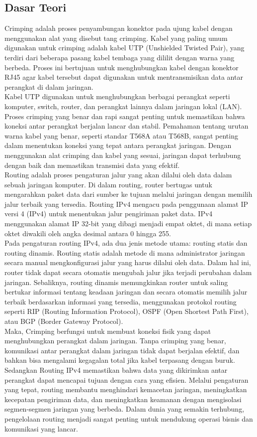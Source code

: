 \subsection{Dasar Teori}
Crimping adalah proses penyambungan konektor pada ujung kabel dengan menggunakan alat yang disebut tang crimping. Kabel yang paling umum digunakan untuk crimping adalah kabel UTP (Unshielded Twisted Pair), yang terdiri dari beberapa pasang kabel tembaga yang dililit dengan warna yang berbeda. Proses ini bertujuan untuk menghubungkan kabel dengan konektor RJ45 agar kabel tersebut dapat digunakan untuk mentransmisikan data antar perangkat di dalam jaringan.\\
Kabel UTP digunakan untuk menghubungkan berbagai perangkat seperti komputer, switch, router, dan perangkat lainnya dalam jaringan lokal (LAN). Proses crimping yang benar dan rapi sangat penting untuk memastikan bahwa koneksi antar perangkat berjalan lancar dan stabil. Pemahaman tentang urutan warna kabel yang benar, seperti standar T568A atau T568B, sangat penting dalam menentukan koneksi yang tepat antara perangkat jaringan. Dengan menggunakan alat crimping dan kabel yang sesuai, jaringan dapat terhubung dengan baik dan memastikan transmisi data yang efektif.\\
Routing adalah proses pengaturan jalur yang akan dilalui oleh data dalam sebuah jaringan komputer. Di dalam routing, router bertugas untuk mengarahkan paket data dari sumber ke tujuan melalui jaringan dengan memilih jalur terbaik yang tersedia. Routing IPv4 mengacu pada penggunaan alamat IP versi 4 (IPv4) untuk menentukan jalur pengiriman paket data. IPv4 menggunakan alamat IP 32-bit yang dibagi menjadi empat oktet, di mana setiap oktet diwakili oleh angka desimal antara 0 hingga 255.\\
Pada pengaturan routing IPv4, ada dua jenis metode utama: routing statis dan routing dinamis. Routing statis adalah metode di mana administrator jaringan secara manual mengkonfigurasi jalur yang harus dilalui oleh data. Dalam hal ini, router tidak dapat secara otomatis mengubah jalur jika terjadi perubahan dalam jaringan. Sebaliknya, routing dinamis memungkinkan router untuk saling bertukar informasi tentang keadaan jaringan dan secara otomatis memilih jalur terbaik berdasarkan informasi yang tersedia, menggunakan protokol routing seperti RIP (Routing Information Protocol), OSPF (Open Shortest Path First), atau BGP (Border Gateway Protocol).\\
Maka, Crimping berfungsi untuk membuat koneksi fisik yang dapat menghubungkan perangkat dalam jaringan. Tanpa crimping yang benar, komunikasi antar perangkat dalam jaringan tidak dapat berjalan efektif, dan bahkan bisa mengalami kegagalan total jika kabel terpasang dengan buruk. Sedangkan Routing IPv4 memastikan bahwa data yang dikirimkan antar perangkat dapat mencapai tujuan dengan cara yang efisien. Melalui pengaturan yang tepat, routing membantu menghindari kemacetan jaringan, meningkatkan kecepatan pengiriman data, dan meningkatkan keamanan dengan mengisolasi segmen-segmen jaringan yang berbeda. Dalam dunia yang semakin terhubung, pengelolaan routing menjadi sangat penting untuk mendukung operasi bisnis dan komunikasi yang lancar.

